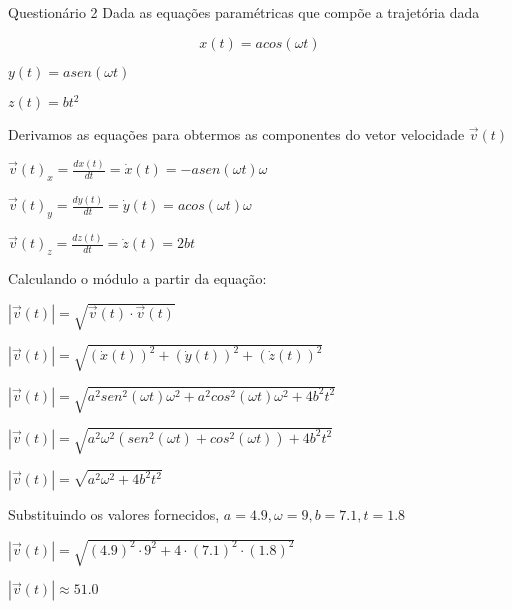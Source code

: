 Questionário 2 
Dada as equações paramétricas que compõe a trajetória dada 

$$x(t) = acos(\omega t)$$

$y(t) = asen(\omega t)$

$z(t)  = bt^{2}$

Derivamos as equações para obtermos as componentes do vetor velocidade $\vec{v}(t)$

$\vec{v}(t)_x  = \frac{dx(t)}{dt} = \dot{x}(t) = -asen(\omega t) \omega$

$\vec{v}(t)_y = \frac{dy(t)}{dt} = \dot{y}(t) = acos(\omega t) \omega$

$\vec{v}(t)_z = \frac{dz(t)}{dt} = \dot{z}(t) = 2bt$

Calculando o módulo a partir da equação:

$|\vec{v}(t)| = \sqrt{\vec{v}(t) \cdot \vec{v}(t)}$

$|\vec{v}(t)| = \sqrt{(\dot{x}(t))^{2} + (\dot{y}(t))^{2} + (\dot{z}(t))^{2}}$

$|\vec{v}(t)| = \sqrt{a^{2}sen^{2}(\omega t) \omega^{2} + a^{2}cos^{2}(\omega t) \omega^{2} + 4b^{2}t^{2}}$

$|\vec{v}(t)| = \sqrt{a^2 \omega^{2} (sen^{2}(\omega t) + cos^{2}(\omega t)) + 4b^{2}t^{2}}$

$|\vec{v}(t)| = \sqrt{a^2 \omega^{2} + 4b^{2}t^{2}}$

Substituindo os valores fornecidos, $a = 4.9, \omega = 9, b = 7.1, t = 1.8$

$|\vec{v}(t)| = \sqrt{(4.9)^{2} \cdot 9^{2} + 4 \cdot (7.1)^{2} \cdot (1.8)^{2}}$

$|\vec{v}(t)| \approx 51.0$